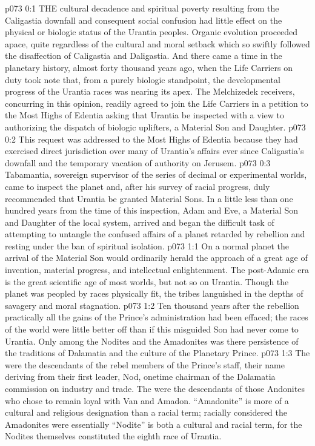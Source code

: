 \vs p073 0:1 THE cultural decadence and spiritual poverty resulting from the Caligastia downfall and consequent social confusion had little effect on the physical or biologic status of the Urantia peoples. Organic evolution proceeded apace, quite regardless of the cultural and moral setback which so swiftly followed the disaffection of Caligastia and Daligastia. And there came a time in the planetary history, almost forty thousand years ago, when the Life Carriers on duty took note that, from a purely biologic standpoint, the developmental progress of the Urantia races was nearing its apex. The Melchizedek receivers, concurring in this opinion, readily agreed to join the Life Carriers in a petition to the Most Highs of Edentia asking that Urantia be inspected with a view to authorizing the dispatch of biologic uplifters, a Material Son and Daughter.
\vs p073 0:2 This request was addressed to the Most Highs of Edentia because they had exercised direct jurisdiction over many of Urantia’s affairs ever since Caligastia’s downfall and the temporary vacation of authority on Jerusem.
\vs p073 0:3 Tabamantia, sovereign supervisor of the series of decimal or experimental worlds, came to inspect the planet and, after his survey of racial progress, duly recommended that Urantia be granted Material Sons. In a little less than one hundred years from the time of this inspection, Adam and Eve, a Material Son and Daughter of the local system, arrived and began the difficult task of attempting to untangle the confused affairs of a planet retarded by rebellion and resting under the ban of spiritual isolation.
\vs p073 1:1 On a normal planet the arrival of the Material Son would ordinarily herald the approach of a great age of invention, material progress, and intellectual enlightenment. The post\hyp{}Adamic era is the great scientific age of most worlds, but not so on Urantia. Though the planet was peopled by races physically fit, the tribes languished in the depths of savagery and moral stagnation.
\vs p073 1:2 Ten thousand years after the rebellion practically all the gains of the Prince’s administration had been effaced; the races of the world were little better off than if this misguided Son had never come to Urantia. Only among the Nodites and the Amadonites was there persistence of the traditions of Dalamatia and the culture of the Planetary Prince.
\vs p073 1:3 The  were the descendants of the rebel members of the Prince’s staff, their name deriving from their first leader, Nod, onetime chairman of the Dalamatia commission on industry and trade. The  were the descendants of those Andonites who chose to remain loyal with Van and Amadon. “Amadonite” is more of a cultural and religious designation than a racial term; racially considered the Amadonites were essentially  “Nodite” is both a cultural and racial term, for the Nodites themselves constituted the eighth race of Urantia.
